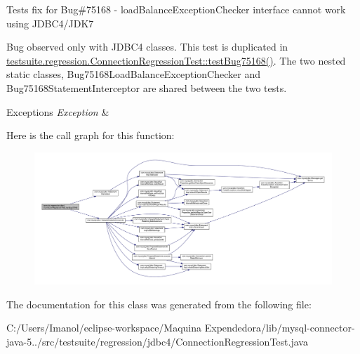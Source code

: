 Tests fix for Bug\#75168 -\/ load\+Balance\+Exception\+Checker interface cannot work using J\+D\+B\+C4/\+J\+D\+K7

Bug observed only with J\+D\+B\+C4 classes. This test is duplicated in \mbox{\hyperlink{classtestsuite_1_1regression_1_1_connection_regression_test_a481102d0bf994ee0a48b67f1a1328c43}{testsuite.\+regression.\+Connection\+Regression\+Test\+::test\+Bug75168()}}. The two nested static classes, Bug75168\+Load\+Balance\+Exception\+Checker and Bug75168\+Statement\+Interceptor are shared between the two tests.


\begin{DoxyExceptions}{Exceptions}
{\em Exception} & \\
\hline
\end{DoxyExceptions}
Here is the call graph for this function\+:
\nopagebreak
\begin{figure}[H]
\begin{center}
\leavevmode
\includegraphics[width=350pt]{classtestsuite_1_1regression_1_1jdbc4_1_1_connection_regression_test_acc4c393fcbc483c6a959f10f561bb1b7_cgraph}
\end{center}
\end{figure}


The documentation for this class was generated from the following file\+:\begin{DoxyCompactItemize}
\item 
C\+:/\+Users/\+Imanol/eclipse-\/workspace/\+Maquina Expendedora/lib/mysql-\/connector-\/java-\/5../src/testsuite/regression/jdbc4/Connection\+Regression\+Test.\+java\end{DoxyCompactItemize}
